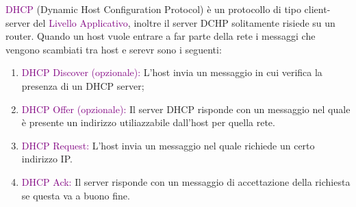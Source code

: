 \textcolor{purple}{DHCP} (Dynamic Host Configuration Protocol) è un protocollo di tipo client-server del \textcolor{purple}{Livello Applicativo}, inoltre il server DCHP solitamente risiede su un router. 
Quando un host vuole entrare a far parte della rete i messaggi che vengono scambiati tra host e serevr sono i seguenti:
\begin{enumerate}
    \item \textcolor{purple}{DHCP Discover (opzionale):} L'host invia un messaggio in cui verifica la presenza di un DHCP server; 
    \item \textcolor{purple}{DHCP Offer (opzionale):}  Il server DHCP risponde con un messaggio nel quale è presente un indirizzo utiliazzabile dall'host per quella rete.
    \item \textcolor{purple}{DHCP Request:} L’host invia un messaggio nel quale richiede un certo indirizzo IP.
    \item \textcolor{purple}{DHCP Ack:} Il server risponde con un messaggio di accettazione della richiesta se questa va a buono fine.
\end{enumerate}

